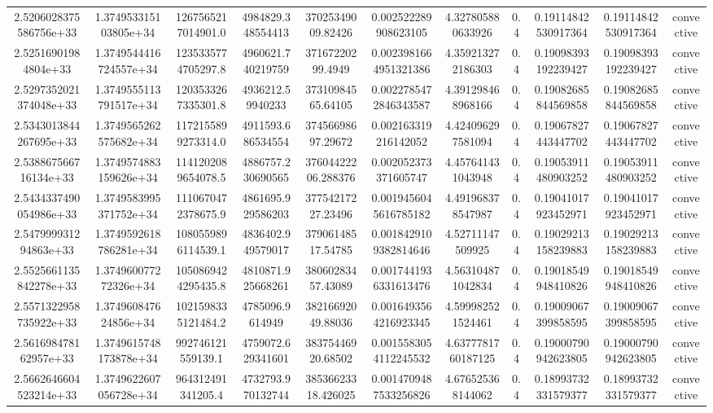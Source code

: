 \begin{table}
\begin{tabular}{ccccccccccc}
2.5206028375586756e+33 & 1.374953315103805e+34 & 1267565217014901.0 & 4984829.348554413 & 37025349009.82426 & 0.002522289908623105 & 4.327805880633926 & 0.4 & 0.19114842530917364 & 0.19114842530917364 & convective \\
2.52516901984804e+33 & 1.3749544416724557e+34 & 1235335774705297.8 & 4960621.740219759 & 37167220299.4949 & 0.0023981664951321386 & 4.359213272186303 & 0.4 & 0.19098393192239427 & 0.19098393192239427 & convective \\
2.5297352021374048e+33 & 1.3749555113791517e+34 & 1203533267335301.8 & 4936212.59940233 & 37310984565.64105 & 0.0022785472846343587 & 4.391298468968166 & 0.4 & 0.19082685844569858 & 0.19082685844569858 & convective \\
2.5343013844267695e+33 & 1.3749565262575682e+34 & 1172155899273314.0 & 4911593.686534554 & 37456698697.29672 & 0.002163319216142052 & 4.424096297581094 & 0.4 & 0.19067827443447702 & 0.19067827443447702 & convective \\
2.538867566716134e+33 & 1.3749574883159626e+34 & 1141202089654078.5 & 4886757.230690565 & 37604422206.288376 & 0.002052373371605747 & 4.457641431043948 & 0.4 & 0.19053911480903252 & 0.19053911480903252 & convective \\
2.5434337490054986e+33 & 1.3749583995371752e+34 & 1110670472378675.9 & 4861695.929586203 & 37754217227.23496 & 0.0019456045616785182 & 4.491968378547987 & 0.4 & 0.19041017923452971 & 0.19041017923452971 & convective \\
2.547999931294863e+33 & 1.3749592618786281e+34 & 1080559896114539.1 & 4836402.949579017 & 37906148517.54785 & 0.0018429109382814646 & 4.52711147509925 & 0.4 & 0.19029213158239883 & 0.19029213158239883 & convective \\
2.5525661135842278e+33 & 1.374960077272326e+34 & 1050869424295435.8 & 4810871.925668261 & 38060283457.43089 & 0.0017441936331613476 & 4.563104871042834 & 0.4 & 0.19018549948410826 & 0.19018549948410826 & convective \\
2.5571322958735922e+33 & 1.374960847624856e+34 & 1021598335121484.2 & 4785096.9614949 & 38216692049.88036 & 0.0016493564216923345 & 4.599982521524461 & 0.4 & 0.19009067399858595 & 0.19009067399858595 & convective \\
2.561698478162957e+33 & 1.3749615748173878e+34 & 992746121559139.1 & 4759072.629341601 & 38375446920.68502 & 0.0015583054112245532 & 4.6377781760187125 & 0.4 & 0.19000790942623805 & 0.19000790942623805 & convective \\
2.5662646604523214e+33 & 1.3749622607056728e+34 & 964312491341205.4 & 4732793.970132744 & 38536623318.426025 & 0.0014709487533256826 & 4.676525368144062 & 0.4 & 0.18993732331579377 & 0.18993732331579377 & convective \\

\end{tabular}
\end{table}
